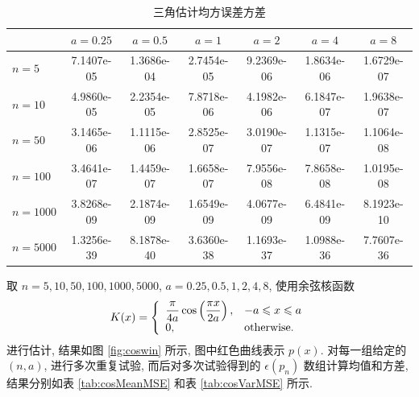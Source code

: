 \documentclass{article}
\begin{document}
\begin{table}[htbp]
  \centering
  \begin{tabular}{l|cccccc}
  \hline
           & $a=0.25$   & $a=0.5$    & $a=1$      & $a=2$      & $a=4$      & $a=8$      \\ \hline
  $n=5$    & 7.1407e-05 & 1.3686e-04 & 2.7454e-05 & 9.2369e-06 & 1.8634e-06 & 1.6729e-07 \\
  $n=10$   & 4.9860e-05 & 2.2354e-05 & 7.8718e-06 & 4.1982e-06 & 6.1847e-07 & 1.9638e-07 \\
  $n=50$   & 3.1465e-06 & 1.1115e-06 & 2.8525e-07 & 3.0190e-07 & 1.1315e-07 & 1.1064e-08 \\
  $n=100$  & 3.4641e-07 & 1.4459e-07 & 1.6658e-07 & 7.9556e-08 & 7.8658e-08 & 1.0195e-08 \\
  $n=1000$ & 3.8268e-09 & 2.1874e-09 & 1.6549e-09 & 4.0677e-09 & 6.4841e-09 & 8.1923e-10 \\
  $n=5000$ & 1.3256e-39 & 8.1878e-40 & 3.6360e-38 & 1.1693e-37 & 1.0988e-36 & 7.7607e-36 \\ \hline
  \end{tabular}
  \caption{三角估计均方误差方差}
  \label{tab:triVarMSE}
\end{table}

取 $n=5,10,50,100,1000,5000$, $a=0.25,0.5,1,2,4,8$, 使用余弦核函数
\begin{equation}
  K(x)=
  \left\{
    \begin{array}{ll}
      \dfrac{\pi}{4a}\cos\left(\dfrac{\pi x}{2a}\right),&-a\leqslant x\leqslant a \\
      0, & \text{otherwise.}
    \end{array}
  \right.
\end{equation} 
进行估计, 结果如图 \ref{fig:coswin} 所示, 图中红色曲线表示 $p(x)$. 对每一组给定的 $(n,a)$, 进行多次重复试验, 而后对多次试验得到的 $\epsilon(p_n)$ 数组计算均值和方差, 结果分别如表 \ref{tab:cosMeanMSE} 和表 \ref{tab:cosVarMSE} 所示.
\end{document}
